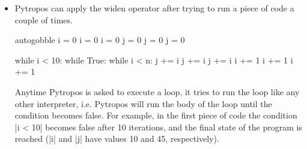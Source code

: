 \begin{itemize}
\begin{pythoncode*}{autogobble}
    either: int = either

    a = [1]
    a[0] = a

    if either > 20:
      a.append(2)
    else:
      a.append(3)
      a[1] -= 1
  \end{pythoncode*}

  Operating with a variable imported from a library is the same as to work with an
  undefined variable. The imported variable \pycode|either| is set to $\top$.

  The type annotation on \pycode|either: int = either| tells Pytropos that \pycode|either|
  is an \pycode|int| value. The result of computing the expression \pycode|either > 20| is
  $\top_{\text{Bool}}$ not a $\top$. Even though $\top_{\text{Bool}}$ is more precise than
  $\top$ ($\top_{\text{Bool}} < \top$), it is not precise enough. Both branches must be
  executed and joined.

  \pycode|a| contains two elements after running \pycode|a.append(2)|: a reference to
  itself and the integer 2.  And \pycode|a| contains two elements after running
  \pycode|a.append(3); a[1] -= 1|: a reference to itself and the integer 2. Both states
  are the same, therefore their joined state is the same.

  The final state of the program is:

  \begin{verbatim}
    H := {
      'either' -> 0
      'a' -> 1
    }
    G := {
      0 -> Top_int
      1 -> (List,
            1,
            {
              'size' -> 1
              ('index', 0) -> 1
              ('index', 1) -> 2
            }
      )
      2 -> 2
    }
  \end{verbatim}

\item Pytropos can apply the widen operator after trying to run a piece of code a couple
  of times.

  \begin{pythoncode*}{autogobble}
      i = 0             i = 0           i = 0
      j = 0             j = 0           j = 0

      while i < 10:     while True:     while i < n:
          j += i            j += i          j += i
          i += 1            i += 1          i += 1
  \end{pythoncode*}

  Anytime Pytropos is asked to execute a loop, it tries to run the loop like any other
  interpreter, i.e. Pytropos will run the body of the loop until the condition becomes
  false. For example, in the first piece of code the condition \pycode|i < 10| becomes
  false after 10 iterations, and the final state of the program is reached (\pycode|i| and
  \pycode|j| have values 10 and 45, respectively).


\end{itemize}
